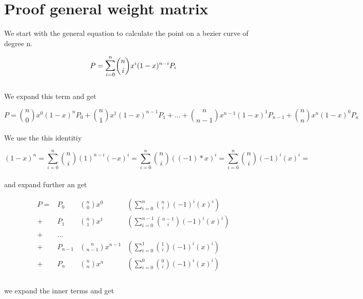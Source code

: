\section{Proof general weight matrix}

We start with the general equation to calculate the point on a bezier curve of degree n.

\begin{equation*}
    P=\mathlarger{\sum}_{i = 0}^{n} {n \choose i}x^i (1-x)^{n-i} P_i
\end{equation*}
\\ We expand this term and get

\begin{equation*}
    P=
    {n \choose 0}x^0 (1-x)^{n} P_0 +
    {n \choose 1}x^1 (1-x)^{n - 1} P_1 +
    \dots +
    {n \choose n-1}x^{n-1} (1-x)^{1} P_{n-1} +
    {n \choose n}x^{n} (1-x)^{0} P_{n}
\end{equation*}
\\
We use the this identitiy

\begin{equation*}
    (1-x)^n =
    \sum_{i = 0}^{n} {n \choose i} (1)^{n-i}(-x)^{i} =
    \sum_{i = 0}^{n} {n \choose i} ((-1)*x)^{i} =
    \sum_{i = 0}^{n} {n \choose i} (-1)^{i}(x)^{i} =
\end{equation*}
\\
and expand further an get

\begin{align*}
    P= & P_0     & {n \choose 0}x^0       & ( \sum_{i = 0}^{n}   {n \choose i}    (-1)^{i}  (x)^{i}) \\
    +  & P_1     & {n \choose 1}x^1       & ( \sum_{i = 0}^{n-1} {n-1 \choose i}  (-1)^{i}  (x)^{i}) \\
    +  & \dots                                                                                       \\
    +  & P_{n-1} & {n \choose n-1}x^{n-1} & ( \sum_{i = 0}^{1}   {1 \choose i}    (-1)^{i}  (x)^{i}) \\
    +  & P_n     & {n \choose n}x^n       & ( \sum_{i = 0}^{0}   {0 \choose i}    (-1)^{i}  (x)^{i}) \\
\end{align*}
\\
we expand the inner terms and get

